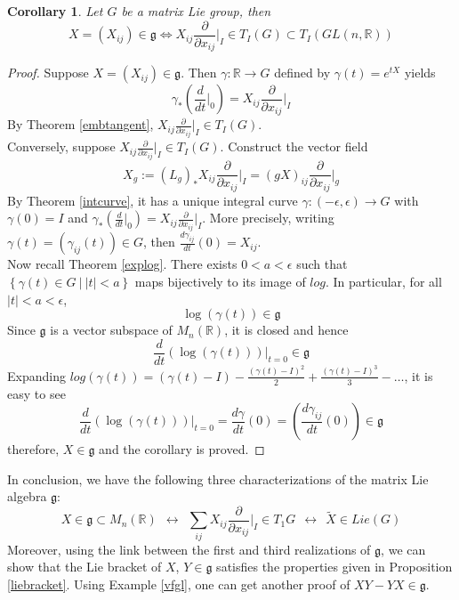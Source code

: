 \documentclass[11pt]{book}
\newtheorem{corollary}[theorem]{Corollary}
\newcommand{\bb}[1]{\mathbb{#1}}
\newcommand{\mf}[1]{\mathfrak{#1}}
\begin{document}
\begin{corollary}
Let $G$ be a matrix Lie group, then
$$X = (X_{ij})\in \mf{g} \Longleftrightarrow X_{ij}\frac{\partial}{\partial x_{ij}}  \Big|_I \in T_I(G) \subset T_I(GL(n,\bb{R}))$$
\end{corollary}
\begin{proof}
Suppose $X = (X_{ij})\in \mf{g}$. Then $\gamma: \bb{R} \to G$ defined by $\gamma(t) = e^{tX}$ yields
$$\gamma_*(\frac{d}{dt}  \Big|_0) = X_{ij}\frac{\partial}{\partial x_{ij}}  \Big|_I$$
By Theorem \ref{embtangent}, $X_{ij}\frac{\partial}{\partial x_{ij}}  \Big|_I \in T_I(G)$.\\

\noindent Conversely, suppose $X_{ij}\frac{\partial}{\partial x_{ij}}  \Big|_I \in T_I(G)$. Construct the vector field
$$X_g := (L_g)_*X_{ij}\frac{\partial}{\partial x_{ij}}  \Big|_I = (gX)_{ij}\frac{\partial}{\partial x_{ij}}  \Big|_g$$
By Theorem \ref{intcurve}, it has a unique integral curve $\gamma: (-\epsilon, \epsilon) \to G$
with $\gamma(0) = I$ and $\gamma_*(\frac{d}{dt}  \Big|_{0}) = X_{ij}\frac{\partial}{\partial x_{ij}}  \Big|_{I}$. More precisely, writing $\gamma(t) = (\gamma_{ij}(t)) \in G$, then $\frac{d\gamma_{ij}}{dt}(0) = X_{ij}$.\\

\noindent Now recall Theorem \ref{explog}. There exists $0 < a < \epsilon$ such that $\left\{ \gamma(t) \in G\ \Big|\ |t|<a \right\}$ maps bijectively to its image of $log$. In particular, for all $|t| < a < \epsilon$,
$$\log(\gamma(t)) \in \mf{g}$$
Since $\mf{g}$ is a vector subspace of $M_n(\bb{R})$, it is closed and hence
$$\frac{d}{dt}(\log(\gamma(t)))  \Big|_{t= 0} \in \mf{g}$$
Expanding $log(\gamma(t)) = (\gamma(t) - I) - \frac{(\gamma(t) - I)^2}{2} + \frac{(\gamma(t) - I)^3}{3} - \dots$, it is easy to see
$$\frac{d}{dt}(\log(\gamma(t)))  \Big|_{t= 0} = \frac{d\gamma}{dt}(0) = (\frac{d\gamma_{ij}}{dt}(0)) \in \mf{g}$$
therefore, $X \in \mf{g}$ and the corollary is proved.
\end{proof}
In conclusion, we have the following three characterizations of the matrix Lie algebra $\mf{g}$:
$$X \in \mf{g} \subset M_{n}(\bb{R})\ \ \longleftrightarrow\ \  \sum_{ij} X_{ij}\frac{\partial}{\partial x_{ij}}  \Big|_I \in T_1G\ \  \longleftrightarrow\ \  \tilde{X} \in Lie(G)$$
Moreover, using the link between the first and third realizations of $\mf{g}$, we can show that the Lie bracket of $X$, $Y \in \mf{g}$ satisfies the properties given in Proposition \ref{liebracket}. Using Example \ref{vfgl}, one can get another proof of $XY - YX \in \mf{g}$.
\end{document}
